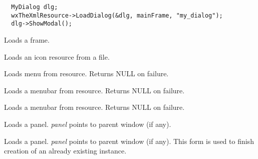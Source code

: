 \begin{verbatim}
  MyDialog dlg;
  wxTheXmlResource->LoadDialog(&dlg, mainFrame, "my_dialog");
  dlg->ShowModal();
\end{verbatim}


\label{wxxmlresourceloadframe}


Loads a frame.


\label{wxxmlresourceloadicon}


Loads an icon resource from a file.


\label{wxxmlresourceloadmenu}


Loads menu from resource. Returns NULL on failure.


\label{wxxmlresourceloadmenubar}


Loads a menubar from resource. Returns NULL on failure.


Loads a menubar from resource. Returns NULL on failure.


\label{wxxmlresourceloadpanel}


Loads a panel. {\it panel} points to parent window (if any).


Loads a panel. {\it panel} points to parent window (if any). This form
is used to finish creation of an already existing instance.


\label{wxxmlresourceloadtoolbar}


